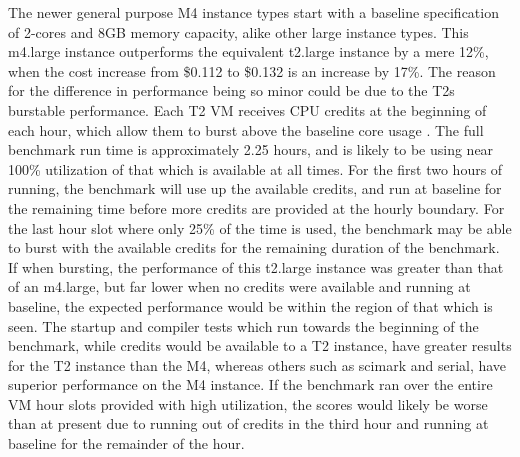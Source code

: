 \documentclass{llncs}
\begin{document}
The newer general purpose M4 instance types start with a baseline specification of 2-cores and 8GB memory capacity, alike other large instance types. This m4.large instance outperforms the equivalent t2.large instance by a mere 12\%, when the cost increase from \$0.112 to \$0.132 is an increase by 17\%. The reason for the difference in performance being so minor could be due to the T2s burstable performance. Each T2 VM receives CPU credits at the beginning of each hour, which allow them to burst above the baseline core usage \cite{awsvmtype}. The full benchmark run time is approximately 2.25 hours, and is likely to be using near 100\% utilization of that which is available at all times. For the first two hours of running, the benchmark will use up the available credits, and run at baseline for the remaining time before more credits are provided at the hourly boundary. For the last hour slot where only 25\% of the time is used, the benchmark may be able to burst with the available credits for the remaining duration of the benchmark. If when bursting, the performance of this t2.large instance was greater than that of an m4.large, but far lower when no credits were available and running at baseline, the expected performance would be within the region of that which is seen. The startup and compiler tests which run towards the beginning of the benchmark, while credits would be available to a T2 instance, have greater results for the T2 instance than the M4, whereas others such as scimark and serial, have superior performance on the M4 instance. If the benchmark ran over the entire VM hour slots provided with high utilization, the scores would likely be worse than at present due to running out of credits in the third hour and running at baseline for the remainder of the hour.


\end{document}
